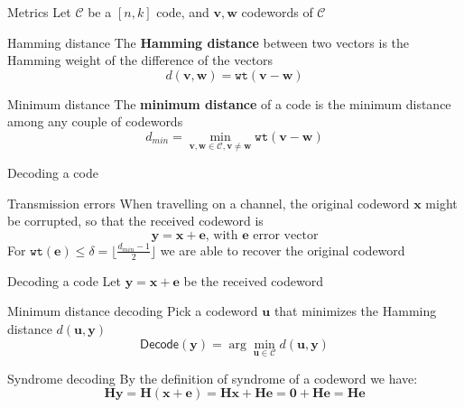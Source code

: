 \begin{frame}{Metrics}
    Let $\mathcal{C}$ be a $[n, k]$ code, and $\mathbf{v, w}$ codewords of $\mathcal{C}$
    \begin{block}{Hamming distance}
        The \textbf{Hamming distance} between two vectors is the Hamming weight of the difference of the vectors
        \begin{equation*}
            d(\mathbf{v, w}) = \mathtt{wt}(\mathbf{v - w})
        \end{equation*}
    \end{block}
    \begin{block}{Minimum distance}
        The \textbf{minimum distance} of a code is the minimum distance among any couple of codewords
        \begin{equation*}
            d_{min} = \min_{\mathbf{v, w} \in \mathcal{C}, \mathbf{v \neq w}} \mathtt{wt}(\mathbf{v-w})
        \end{equation*}
    \end{block}
\end{frame}

\begin{frame}{Decoding a code}
    \begin{block}{Transmission errors}
        When travelling on a channel, the original codeword $\mathbf{x}$ might be corrupted, so that the received codeword is 
        \begin{equation*}
            \mathbf{y} = \mathbf{x} + \mathbf{e} \text{, with } \mathbf{e} \text{ error vector}
        \end{equation*}
        For $\mathtt{wt}(\mathbf{e}) \leq \delta = \lfloor \frac{d_{min} - 1}{2} \rfloor$ we are able to recover the original codeword
    \end{block}
\end{frame}

\begin{frame}{Decoding a code}
    Let $\mathbf{y = x+e}$ be the received codeword
    \begin{block}{Minimum distance decoding}
        Pick a codeword $\mathbf{u}$ that minimizes the Hamming distance $d(\mathbf{u, y})$\
        \begin{equation*}
            \textsf{Decode}(\mathbf{y}) = \arg\min_{\mathbf{u} \in \mathcal{C}} d(\mathbf{u, y})
        \end{equation*}
    \end{block}
    \begin{block}{Syndrome decoding}
        By the definition of syndrome of a codeword we have:
        \begin{equation*}
            \mathbf{Hy} = \mathbf{H(x+e)} = \mathbf{Hx+He} = \mathbf{0 + He} = \mathbf{He} 
        \end{equation*}
    \end{block}
\end{frame}

